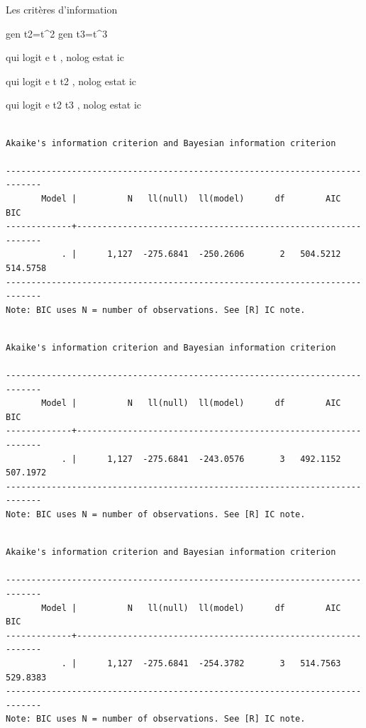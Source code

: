 \documentclass[
  12pt,
  letterpaper,
  DIV=11,
  numbers=noendperiod,
  onepage,
  openany]{scrreprt}
\newenvironment{Shaded}{\begin{snugshade}}{\end{snugshade}}
\newcommand{\FunctionTok}[1]{\textcolor[rgb]{0.94,0.94,0.56}{#1}}
\newcommand{\KeywordTok}[1]{\textcolor[rgb]{0.94,0.87,0.69}{#1}}
\newcommand{\NormalTok}[1]{\textcolor[rgb]{0.80,0.80,0.80}{#1}}
\begin{document}
Les critères d'information

\begin{Shaded}
\begin{Highlighting}[]
\KeywordTok{gen}\NormalTok{ t2=t\^{}2}
\KeywordTok{gen}\NormalTok{ t3=t\^{}3}

\KeywordTok{qui} \KeywordTok{logit} \FunctionTok{e}\NormalTok{  t ,  }\KeywordTok{nolog} 
\KeywordTok{estat} \KeywordTok{ic}

\KeywordTok{qui} \KeywordTok{logit} \FunctionTok{e}\NormalTok{  t t2 ,  }\KeywordTok{nolog} 
\KeywordTok{estat} \KeywordTok{ic}

\KeywordTok{qui} \KeywordTok{logit} \FunctionTok{e}\NormalTok{  t2 t3 ,  }\KeywordTok{nolog} 
\KeywordTok{estat} \KeywordTok{ic}
\end{Highlighting}
\end{Shaded}

\begin{verbatim}

Akaike's information criterion and Bayesian information criterion

-----------------------------------------------------------------------------
       Model |          N   ll(null)  ll(model)      df        AIC        BIC
-------------+---------------------------------------------------------------
           . |      1,127  -275.6841  -250.2606       2   504.5212   514.5758
-----------------------------------------------------------------------------
Note: BIC uses N = number of observations. See [R] IC note.
\end{verbatim}

\begin{verbatim}

Akaike's information criterion and Bayesian information criterion

-----------------------------------------------------------------------------
       Model |          N   ll(null)  ll(model)      df        AIC        BIC
-------------+---------------------------------------------------------------
           . |      1,127  -275.6841  -243.0576       3   492.1152   507.1972
-----------------------------------------------------------------------------
Note: BIC uses N = number of observations. See [R] IC note.
\end{verbatim}

\begin{verbatim}

Akaike's information criterion and Bayesian information criterion

-----------------------------------------------------------------------------
       Model |          N   ll(null)  ll(model)      df        AIC        BIC
-------------+---------------------------------------------------------------
           . |      1,127  -275.6841  -254.3782       3   514.7563   529.8383
-----------------------------------------------------------------------------
Note: BIC uses N = number of observations. See [R] IC note.
\end{verbatim}
\end{document}
